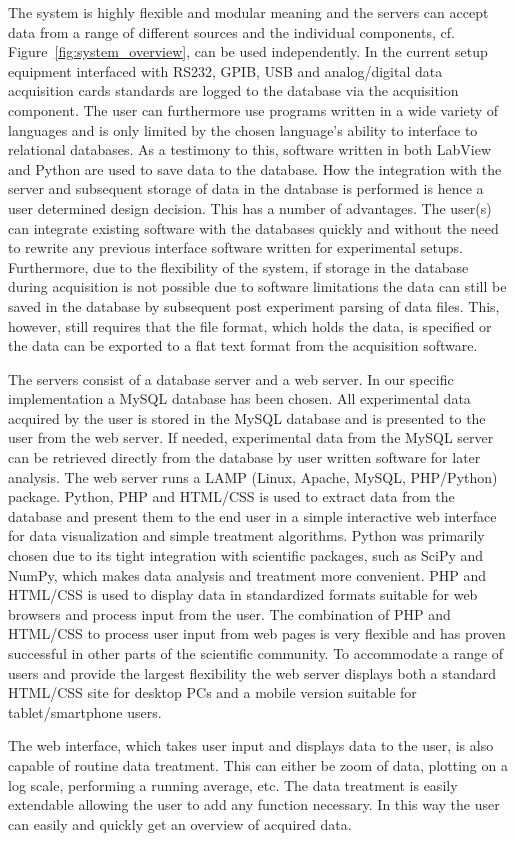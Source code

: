 The system is highly flexible and modular meaning and the servers can accept
data from a range of different sources and the individual components, cf.
Figure~\ref{fig:system_overview}, can be used independently. In the current
setup equipment interfaced with RS232, GPIB, USB and analog/digital data
acquisition cards standards are logged to the database via the acquisition
component. The user can furthermore use programs written in a wide variety of
languages and is only limited by the chosen language's ability to interface to
relational databases. As a testimony to this, software written in both LabView
and Python\cite{python} are used to save data to the database. How the
integration with the server and subsequent storage of data in the database is
performed is hence a user determined design decision. This has a number of
advantages. The user(s) can integrate existing software with the databases
quickly and without the need to rewrite any previous interface software written
for experimental setups. Furthermore, due to the flexibility of the system, if
storage in the database during acquisition is not possible due to software
limitations the data can still be saved in the database by subsequent post
experiment parsing of data files. This, however, still requires that the file
format, which holds the data, is specified or the data can be exported to a
flat text format from the acquisition software.

The servers consist of a database server and a web server. In our specific
implementation a MySQL database has been chosen. All experimental data acquired
by the user is stored in the MySQL database and is presented to the user from
the web server. If needed, experimental data from the MySQL server can be
retrieved directly from the database by user written software for later
analysis. The web server runs a LAMP (Linux, Apache, MySQL, PHP/Python)
package. Python, PHP and HTML/CSS is used to extract data from the database
and present them to the end user in a simple interactive web interface for data
visualization and simple treatment algorithms. Python was primarily chosen due
to its tight integration with scientific packages, such as SciPy and NumPy,
which makes data analysis and treatment more convenient\cite{Cahn2007}. PHP and
HTML/CSS is used to display data in standardized formats suitable for web
browsers and process input from the user. The combination of PHP and HTML/CSS
to process user input from web pages is very flexible and has proven successful
in other parts of the scientific community\cite{Crane2008}. To accommodate a
range of users and provide the largest flexibility the web server displays both
a standard HTML/CSS site for desktop PCs and a mobile version suitable for
tablet/smartphone users.

The web interface, which takes user input and displays data to the user, is also
capable of routine data treatment. This can either be zoom of data, plotting on
a log scale, performing a running average, etc. The data treatment is easily
extendable allowing the user to add any function necessary. In this way the
user can easily and quickly get an overview of acquired data.
